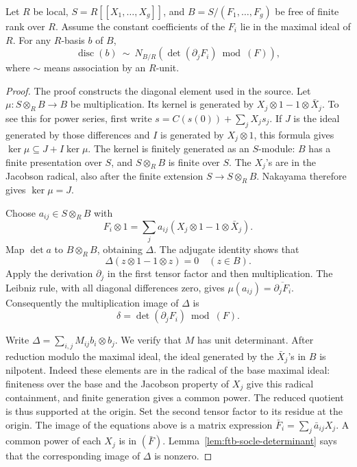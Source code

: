 \begin{srlemma}
\label{lem:ftb-formal-discriminant-jacobian}
Let \(R\) be local, \(S=R[[X_1,\ldots,X_g]]\), and
\(B=S/(F_1,\ldots,F_g)\) be free of finite rank over \(R\).
Assume the constant coefficients of the \(F_i\) lie in the maximal
ideal of \(R\).  For any \(R\)-basis \(b\) of \(B\),
\[
 \operatorname{disc}(b)\ \sim\
       N_{B/R}\!\left(\det(\partial_jF_i)\bmod(F)\right),
 \tag{K13}\label{eq:ftb-disc-jac}
\]
where \(\sim\) means association by an \(R\)-unit.
\end{srlemma}
\begin{proof}
The proof constructs the diagonal element used in the source.
Let
\(\mu:S\otimes_R B\to B\) be multiplication.
Its kernel is generated by
\(X_j\otimes1-1\otimes\bar X_j\).
To see this for power series, first write
\(s=C(s(0))+\sum_jX_js_j\).
If \(J\) is the ideal generated by those differences and
\(I\) is generated by \(X_j\otimes1\), this formula gives
\(\ker\mu\subseteq J+I\ker\mu\).
The kernel is finitely generated as an \(S\)-module:
\(B\) has a finite presentation over \(S\), and
\(S\otimes_R B\) is finite over \(S\).
The \(X_j\)'s are in the Jacobson radical, also after the finite
extension \(S\to S\otimes_RB\).
Nakayama therefore gives \(\ker\mu=J\).

Choose \(a_{ij}\in S\otimes_RB\) with
\[
 F_i\otimes1=\sum_j a_{ij}
              (X_j\otimes1-1\otimes\bar X_j).
\]
Map \(\det a\) to \(B\otimes_RB\), obtaining \(\Delta\).
The adjugate identity shows that
\[
       \Delta(z\otimes1-1\otimes z)=0\quad(z\in B).
 \tag{K14}\label{eq:ftb-diagonal-annihilator}
\]
Apply the derivation \(\partial_j\) in the first tensor factor and
then multiplication.  The Leibniz rule, with all diagonal
differences zero, gives
\(\mu(a_{ij})=\overline{\partial_jF_i}\).
Consequently the multiplication image of \(\Delta\) is
\[
                  \delta=\det(\partial_jF_i)\bmod(F).
\]

Write \(\Delta=\sum_{i,j}M_{ij}b_i\otimes b_j\).
We verify that \(M\) has unit determinant.
After reduction modulo the maximal ideal, the ideal generated by
the \(\bar X_j\)'s in \(B\) is nilpotent.  Indeed these elements
are in the radical of the base maximal ideal: finiteness over the
base and the Jacobson property of \(X_j\) give this radical
containment, and finite generation gives a common power.
The reduced quotient is thus supported at the origin.
Set the second tensor factor to its residue at the origin.
The image of the equations above is a matrix expression
\(\bar F_i=\sum_j\bar a_{ij}X_j\).
A common power of each \(X_j\) is in \((\bar F)\).
Lemma~\ref{lem:ftb-socle-determinant} says that the corresponding
image of \(\Delta\) is nonzero.


\end{proof}
